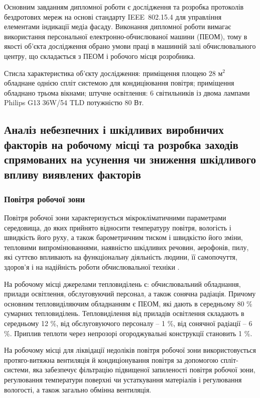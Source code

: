 \documentclass[a4paper,ukrainian,utf8,nocolumnsxix,floatsection,equationsection]{eskdtext}
\renewcommand\paragraph{\subsubsection}
\newcommand{\iee}[0]{IEEE~802.15.4\xspace}
\begin{document}
Основним завданням дипломної роботи є дослідження та розробка протоколів бездротових мереж на основі стандарту \iee для управління елементами індикації медіа фасаду. Виконання дипломної роботи вимагає використання персональної електронно-обчислюваної машини (ПЕОМ), тому в якості об’єкта дослідження обрано умови праці в машинній залі обчислювального центру, що складається з ПЕОМ і робочого місця розробника.

Стисла характеристика об’єкту дослідження: приміщення площею $28 \text{ м}^2$ обладнане однією спліт системою для кондиціювання повітря; приміщення обладнано трьома вікнами; штучне освітлення: 6 світильників із двома лампами Philips G13 36W/54 TLD потужністю 80 Вт.


\subsection{Аналіз небезпечних і шкідливих виробничих факторів на робочому місці та розробка заходів спрямованих на усунення чи зниження шкідливого впливу виявлених факторів}

\paragraph{Повітря робочої зони}

Повітря робочої зони характеризується мікрокліматичними параметрами середовища, до яких прийнято відносити температуру повітря, вологість і швидкість його руху, а також барометричним тиском і швидкістю його зміни, тепловими випромінюваннями, наявністю шкідливих речовин, аерофонів, пилу, які суттєво впливають на функціональну діяльність людини, її самопочуття, здоров'я і на надійність роботи обчислювальної техніки \cite{work:safety:17}. 

На робочому місці джерелами тепловиділень є: обчислювальний обладнання, прилади освітлення, обслуговуючий персонал, а також сонячна радіація. Причому основним тепловиділяючим обладнанням є ПЕОМ, які дають в середньому 80 \% сумарних тепловиділень. Тепловиділення від приладів освітлення складають в середньому 12 \%, від обслуговуючого персоналу – 1 \%, від сонячної радіації – 6 \%. Приплив теплоти через непрозорі огороджувальні конструкції становить 1 \%.

На робочому місці для ліквідації недоліків повітря робочої зони використовується протяго-витяжна вентиляція й кондиціонування повітря за допомогою спліт-системи, яка забезпечує фільтрацію підвищеної запиленості повітря робочої зони, регулювання температури поверхні чи устаткування матеріалів і регулювання вологості, а також загально обмінна вентиляція.
\end{document}
